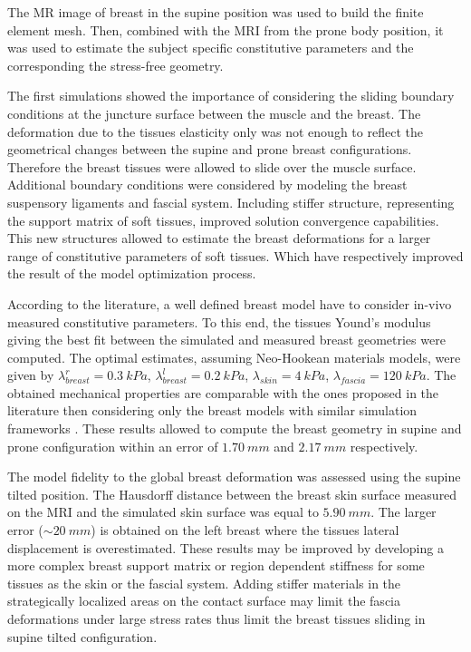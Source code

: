  The MR image of breast in the supine position was used to build the finite element mesh. Then, combined with the MRI from the prone body position, it was used to estimate the subject specific constitutive parameters and the corresponding the stress-free geometry. 
 
 The first simulations showed the importance of considering the sliding boundary conditions at the juncture surface between  the muscle and the breast. The deformation due to the tissues elasticity only was not enough to reflect the geometrical changes between the supine and prone breast configurations. Therefore the breast tissues were allowed to slide over the muscle surface. Additional boundary conditions were considered by modeling the breast suspensory ligaments and fascial system. Including stiffer structure, representing the support matrix of soft tissues, improved solution convergence capabilities. This new structures allowed to estimate the breast deformations for a larger range of constitutive parameters of soft tissues. Which have respectively improved the result of the model optimization process.   
 
 According to the literature, a well defined breast model have to consider in-vivo measured constitutive parameters. To this end, the tissues Yound's modulus giving the best fit between the simulated and measured breast geometries were computed. The optimal estimates, assuming Neo-Hookean materials models, were given by $\lambda_{breast}^r=0.3\ kPa$, $\lambda_{breast}^l=0.2\ kPa$, $\lambda_{skin}=4\ kPa$, $\lambda_{fascia}=120\ kPa$. The obtained mechanical properties are comparable with the ones proposed in the literature then considering only the breast models with similar simulation frameworks \cite{rajagopal_modelling_2007, gamage_modelling_2012, griesenauer_breast_2017}. These results allowed to compute the breast geometry in supine and prone configuration within an error of $1.70\ mm$ and $2.17\ mm$ respectively. 
 
The model fidelity to the global breast deformation was assessed using the supine tilted position. The Hausdorff distance between the breast skin surface measured on the MRI and the simulated skin surface was equal to $5.90 \ mm$. The larger error ($\sim 20 \ mm$) is obtained on the left breast where the tissues lateral displacement is overestimated. These results may be improved by developing a more complex breast support matrix or region dependent stiffness for some tissues as the skin or the fascial system. Adding stiffer materials in the strategically localized areas on the contact surface may limit the fascia deformations under large stress rates thus limit the breast tissues sliding in supine tilted configuration. 

